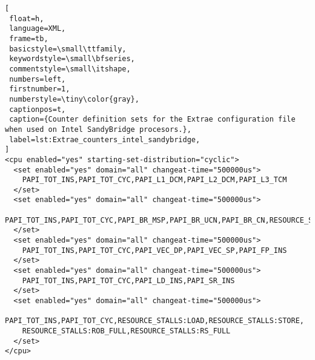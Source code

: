 \begin{lstlisting}[
 float=h,
 language=XML,
 frame=tb,
 basicstyle=\small\ttfamily,
 keywordstyle=\small\bfseries,
 commentstyle=\small\itshape,
 numbers=left,
 firstnumber=1,
 numberstyle=\tiny\color{gray},
 captionpos=t,
 caption={Counter definition sets for the Extrae configuration file when used on Intel SandyBridge procesors.},
 label=lst:Extrae_counters_intel_sandybridge,
]
<cpu enabled="yes" starting-set-distribution="cyclic">
  <set enabled="yes" domain="all" changeat-time="500000us">
    PAPI_TOT_INS,PAPI_TOT_CYC,PAPI_L1_DCM,PAPI_L2_DCM,PAPI_L3_TCM
  </set>
  <set enabled="yes" domain="all" changeat-time="500000us">
    PAPI_TOT_INS,PAPI_TOT_CYC,PAPI_BR_MSP,PAPI_BR_UCN,PAPI_BR_CN,RESOURCE_STALLS
  </set>
  <set enabled="yes" domain="all" changeat-time="500000us">
    PAPI_TOT_INS,PAPI_TOT_CYC,PAPI_VEC_DP,PAPI_VEC_SP,PAPI_FP_INS
  </set>
  <set enabled="yes" domain="all" changeat-time="500000us">
    PAPI_TOT_INS,PAPI_TOT_CYC,PAPI_LD_INS,PAPI_SR_INS
  </set>
  <set enabled="yes" domain="all" changeat-time="500000us">
    PAPI_TOT_INS,PAPI_TOT_CYC,RESOURCE_STALLS:LOAD,RESOURCE_STALLS:STORE,
    RESOURCE_STALLS:ROB_FULL,RESOURCE_STALLS:RS_FULL
  </set>
</cpu>
\end{lstlisting}
